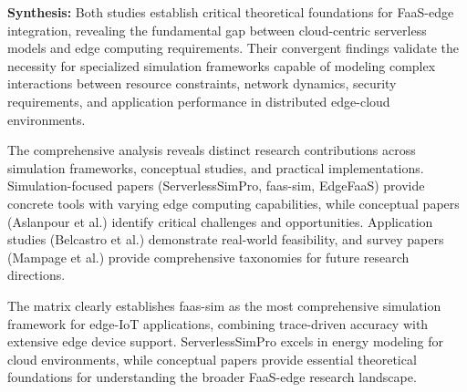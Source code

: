 \vspace{1em}

\textbf{Synthesis:} Both studies establish critical theoretical foundations for FaaS-edge integration, revealing the fundamental gap between cloud-centric serverless models and edge computing requirements. Their convergent findings validate the necessity for specialized simulation frameworks capable of modeling complex interactions between resource constraints, network dynamics, security requirements, and application performance in distributed edge-cloud environments.

The comprehensive analysis reveals distinct research contributions across simulation frameworks, conceptual studies, and practical implementations. Simulation-focused papers (ServerlessSimPro, faas-sim, EdgeFaaS) provide concrete tools with varying edge computing capabilities, while conceptual papers (Aslanpour et al.) identify critical challenges and opportunities. Application studies (Belcastro et al.) demonstrate real-world feasibility, and survey papers (Mampage et al.) provide comprehensive taxonomies for future research directions.

The matrix clearly establishes faas-sim as the most comprehensive simulation framework for edge-IoT applications, combining trace-driven accuracy with extensive edge device support. ServerlessSimPro excels in energy modeling for cloud environments, while conceptual papers provide essential theoretical foundations for understanding the broader FaaS-edge research landscape.
